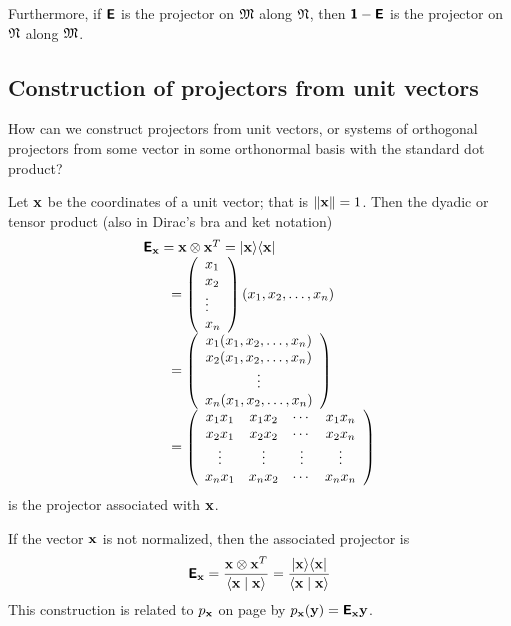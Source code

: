 Furthermore, if $\textsf{\textbf{E}}$  is the projector
on ${\frak M}$
along ${\frak N}$,
then
 $\textsf{\textbf{1}}-\textsf{\textbf{E}}$ is the projector
on ${\frak N}$
along ${\frak M}$.




\subsection{Construction of projectors from unit vectors}

How can we construct projectors from unit vectors, or systems of orthogonal projectors from some vector in some orthonormal basis
with the standard dot product?

Let ${\bf x}$ be the coordinates of a unit vector;
that is $\|{\bf x} \| =1$.
Then   the dyadic or tensor product  (also in Dirac's bra and ket notation)
\begin{equation}
\begin{array}{l}
\textsf{\textbf{E}}_{\bf x} = {\bf x} \otimes {\bf x}^T = \vert{\bf x}\rangle \langle {\bf x}\vert
\\
\qquad
=
\left(
\begin{array}{l}
x_1\\
x_2\\
\vdots \\
x_n
\end{array}
\right)
(x_1,x_2,\ldots ,x_n)\\
\qquad
=
\left(
\begin{array}{cccccccccccccccc}
x_1(x_1,x_2,\ldots ,x_n)\\
x_2(x_1,x_2,\ldots ,x_n)\\
\vdots  \\
x_n(x_1,x_2,\ldots ,x_n)
\end{array}
\right) \\
\qquad
=
\left(
\begin{array}{cccccccccccccccc}
x_1x_1&x_1x_2& \cdots&x_1x_n\\
x_2x_1&x_2x_2& \cdots&x_2x_n\\
\vdots & \vdots & \vdots &\vdots \\
x_nx_1&x_nx_2& \cdots&x_nx_n
\end{array}
\right)
\end{array}
\end{equation}
is the projector
associated with ${\bf x}$.

If the vector ${\bf x}$ is not normalized,
then the associated projector is
\begin{equation}
\textsf{\textbf{E}}_{\bf x} = \frac{{\bf x} \otimes {\bf x}^T}{\langle {\bf x}\mid {\bf x}\rangle}
= \frac{\vert{\bf x}\rangle \langle {\bf x}\vert}{\langle {\bf x}\mid {\bf x}\rangle}
\end{equation}
This construction is related to
$p_{\bf x}$ on page \pageref{2011-m-gsp}
by $p_{\bf x}({\bf y})=\textsf{\textbf{E}}_{\bf x}{\bf y}$.

